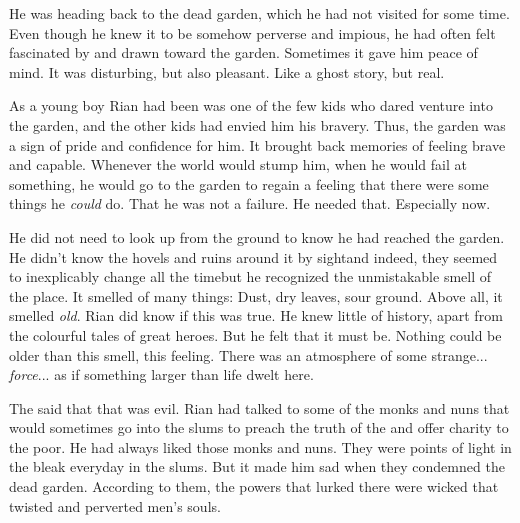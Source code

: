 He was heading back to the dead garden, which he had not visited for some time. 
Even though he knew it to be somehow perverse and impious, he had often felt fascinated by and drawn toward the garden. 
Sometimes it gave him peace of mind. 
It was disturbing, but also pleasant. 
Like a ghost story, but real. 

As a young boy Rian had been was one of the few kids who dared venture into the garden, and the other kids had envied him his bravery. 
Thus, the garden was a sign of pride and confidence for him. 
It brought back memories of feeling brave and capable. 
Whenever the world would stump him, when he would fail at something, he would go to the garden to regain a feeling that there were some things he \emph{could} do. 
That he was not a failure. 
He needed that. 
Especially now. 

He did not need to look up from the ground to know he had reached the garden. 
He didn't know the hovels and ruins around it by sight\dash and indeed, they seemed to inexplicably change all the time\dash but he recognized the unmistakable smell of the place. 
It smelled of many things: 
Dust, dry leaves, sour ground. 
Above all, it smelled \emph{old}. 
Rian did know if this was true. 
He knew little of history, apart from the colourful tales of great heroes. 
But he felt that it must be. 
Nothing could be older than this smell, this feeling. 
There was an atmosphere of some strange... \emph{force}... as if something larger than life dwelt here. 

The  said that that  was evil. 
Rian had talked to some of the monks and nuns that would sometimes go into the slums to preach the truth of the  and offer charity to the poor. 
He had always liked those monks and nuns. 
They were points of light in the bleak everyday in the slums. 
But it made him sad when they condemned the dead garden. 
According to them, the powers that lurked there were wicked  that twisted and perverted men's souls. 


